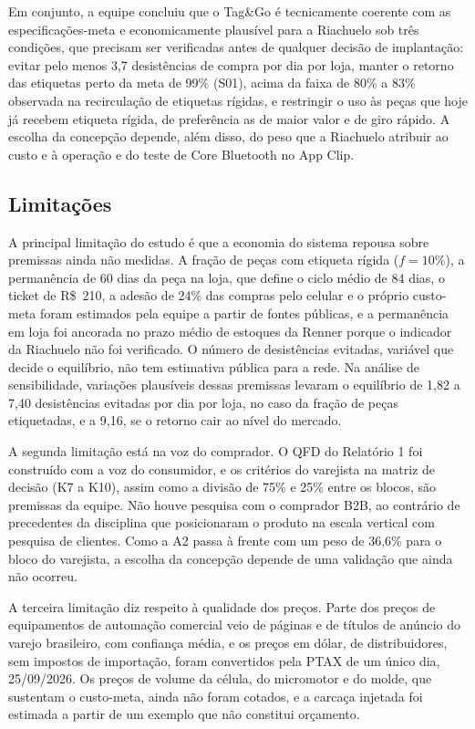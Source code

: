 Em conjunto, a equipe concluiu que o Tag\&Go é tecnicamente coerente com as especificações-meta e economicamente plausível para a Riachuelo sob três condições, que precisam ser verificadas antes de qualquer decisão de implantação: evitar pelo menos 3,7 desistências de compra por dia por loja, manter o retorno das etiquetas perto da meta de 99\% (S01), acima da faixa de 80\% a 83\% observada na recirculação de etiquetas rígidas, e restringir o uso às peças que hoje já recebem etiqueta rígida, de preferência as de maior valor e de giro rápido. A escolha da concepção depende, além disso, do peso que a Riachuelo atribuir ao custo e à operação e do teste de Core Bluetooth no App Clip.

\subsection{Limitações}

A principal limitação do estudo é que a economia do sistema repousa sobre premissas ainda não medidas. A fração de peças com etiqueta rígida ($f = 10\%$), a permanência de 60 dias da peça na loja, que define o ciclo médio de 84 dias, o ticket de R\$~210, a adesão de 24\% das compras pelo celular e o próprio custo-meta foram estimados pela equipe a partir de fontes públicas, e a permanência em loja foi ancorada no prazo médio de estoques da Renner porque o indicador da Riachuelo não foi verificado. O número de desistências evitadas, variável que decide o equilíbrio, não tem estimativa pública para a rede. Na análise de sensibilidade, variações plausíveis dessas premissas levaram o equilíbrio de 1,82 a 7,40 desistências evitadas por dia por loja, no caso da fração de peças etiquetadas, e a 9,16, se o retorno cair ao nível do mercado.

A segunda limitação está na voz do comprador. O QFD do Relatório 1 foi construído com a voz do consumidor, e os critérios do varejista na matriz de decisão (K7 a K10), assim como a divisão de 75\% e 25\% entre os blocos, são premissas da equipe. Não houve pesquisa com o comprador B2B, ao contrário de precedentes da disciplina que posicionaram o produto na escala vertical com pesquisa de clientes. Como a A2 passa à frente com um peso de 36,6\% para o bloco do varejista, a escolha da concepção depende de uma validação que ainda não ocorreu.

A terceira limitação diz respeito à qualidade dos preços. Parte dos preços de equipamentos de automação comercial veio de páginas e de títulos de anúncio do varejo brasileiro, com confiança média, e os preços em dólar, de distribuidores, sem impostos de importação, foram convertidos pela PTAX de um único dia, 25/09/2026. Os preços de volume da célula, do micromotor e do molde, que sustentam o custo-meta, ainda não foram cotados, e a carcaça injetada foi estimada a partir de um exemplo que não constitui orçamento.

